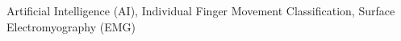 \begin{IEEEkeywords}
Artificial Intelligence (AI), Individual Finger Movement Classification, Surface Electromyography (EMG)
\end{IEEEkeywords}
